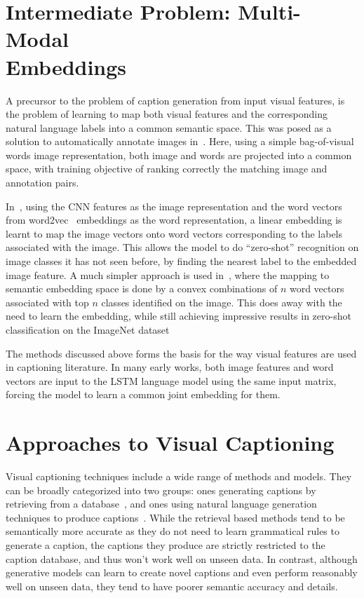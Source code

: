 \section{Intermediate Problem: Multi-Modal \\Embeddings}
A precursor to the problem of caption generation from input visual features, is
the problem of learning to map both visual features and the
corresponding natural language labels into a common semantic space.
This was posed as a solution to automatically annotate images
in~\cite{weston2010large}.
Here, using a simple bag-of-visual words image representation, both image and
words are projected into a common space, with training objective of ranking
correctly the matching image and annotation pairs. 

In~\cite{frome2013devise}, using the CNN features as the image representation and
the word vectors from word2vec~\cite{mikolov2013distributed} embeddings as the word
representation, a linear embedding is learnt to map the image vectors onto
word vectors corresponding to the labels associated with the image.
This allows the model to do ``zero-shot'' recognition on image classes it has
not seen before, by finding the nearest label to the embedded image feature.
A much simpler approach is used in~\cite{norouzi2013zero}, where the mapping to
semantic embedding space is done by a convex combinations of $n$ word vectors
associated with top $n$ classes identified on the image.
This does away with the need to learn the embedding, while still achieving
impressive results in zero-shot classification on the ImageNet dataset

The methods discussed above forms the basis for the way visual features are used
in captioning literature.
In many early works, both image features and word vectors are input to the LSTM
language model using the same input matrix, forcing the model to learn a common
joint embedding for them.

\section{Approaches to Visual Captioning}
Visual captioning techniques include a wide range of methods and models.
They can be broadly categorized into two groups: ones generating captions by
retrieving from a database~\cite{Farhadi2010, Hodosh2013,Karpathy2014},
and ones using natural language generation techniques to produce
captions~\cite{Li2011,kulkarni2013babytalk,Vinyals_2015_CVPR,Fang2015}.
While the retrieval based methods tend to be semantically more accurate as they
do not need to learn grammatical rules to generate a caption, the captions they
produce are strictly restricted to the caption database, and thus won't work
well on unseen data.
In contrast, although generative models can learn to create novel captions and even
perform reasonably well on unseen data, they tend to have poorer semantic
accuracy and details.

